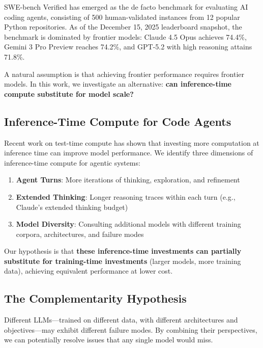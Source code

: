 \documentclass[11pt,a4paper]{article}
\begin{document}
SWE-bench Verified \citep{jimenez2024swebench} has emerged as the de facto benchmark for evaluating AI coding agents, consisting of 500 human-validated instances from 12 popular Python repositories. As of the December 15, 2025 leaderboard snapshot, the benchmark is dominated by frontier models: Claude 4.5 Opus achieves 74.4\%, Gemini 3 Pro Preview reaches 74.2\%, and GPT-5.2 with high reasoning attains 71.8\%.

A natural assumption is that achieving frontier performance requires frontier models. In this work, we investigate an alternative: \textbf{can inference-time compute substitute for model scale?}

\subsection{Inference-Time Compute for Code Agents}

Recent work on test-time compute \citep{snell2024scaling,openai2024reasoning} has shown that investing more computation at inference time can improve model performance. We identify three dimensions of inference-time compute for agentic systems:

\begin{enumerate}
    \item \textbf{Agent Turns}: More iterations of thinking, exploration, and refinement
    \item \textbf{Extended Thinking}: Longer reasoning traces within each turn (e.g., Claude's extended thinking budget)
    \item \textbf{Model Diversity}: Consulting additional models with different training corpora, architectures, and failure modes
\end{enumerate}

Our hypothesis is that \textbf{these inference-time investments can partially substitute for training-time investments} (larger models, more training data), achieving equivalent performance at lower cost.

\subsection{The Complementarity Hypothesis}

Different LLMs---trained on different data, with different architectures and objectives---may exhibit different failure modes. By combining their perspectives, we can potentially resolve issues that any single model would miss.
\end{document}
